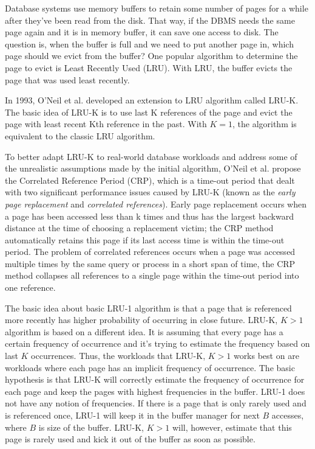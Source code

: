 Database systems use memory buffers to retain some number of pages for a while after they've been read from the disk. That way, if the DBMS needs the same page again and it is in memory buffer, it can save one access to disk. The question is, when the buffer is full and we need to put another page in, which page should we evict from the buffer? One popular algorithm to determine the page to evict is Least Recently Used (LRU). With LRU, the buffer evicts the page that was used least recently.

In 1993, O'Neil et al. \cite{lruk} developed an extension to LRU algorithm called LRU-K. The basic idea of LRU-K is to use last K references of the page and evict the page with least recent Kth reference in the past. With $K = 1$, the algorithm is equivalent to the classic LRU algorithm.

To better adapt LRU-K to real-world database workloads and address some of the unrealistic assumptions made by the initial algorithm, O'Neil et al. propose the Correlated Reference Period (CRP), which is a time-out period that dealt with two significant performance issues caused by LRU-K (known as the \emph{early page replacement} and \emph{correlated references}). Early page replacement occurs when a page has been accessed less than k times and thus has the largest backward distance at the time of choosing a replacement victim; the CRP method automatically retains this page if its last access time is within the time-out period. The problem of correlated references occurs when a page was accessed multiple times by the same query or process in a short span of time, the CRP method collapses all references to a single page within the time-out period into one reference.

The basic idea about basic LRU-1 algorithm is that a page that is referenced more recently has higher probability of occurring in close future. LRU-K, $K > 1$ algorithm is based on a different idea. It is assuming that every page has a certain frequency of occurrence and it's trying to estimate the frequency based on last $K$ occurrences. Thus, the workloads that LRU-K, $K > 1$ works best on are workloads where each page has an implicit frequency of occurrence. The basic hypothesis is that LRU-K will correctly estimate the frequency of occurrence for each page and keep the pages with highest frequencies in the buffer. LRU-1 does not have any notion of frequencies. If there is a page that is only rarely used and is referenced once, LRU-1 will keep it in the buffer manager for next $B$ accesses, where $B$ is size of the buffer. LRU-K, $K > 1$ will, however, estimate that this page is rarely used and kick it out of the buffer as soon as possible.

